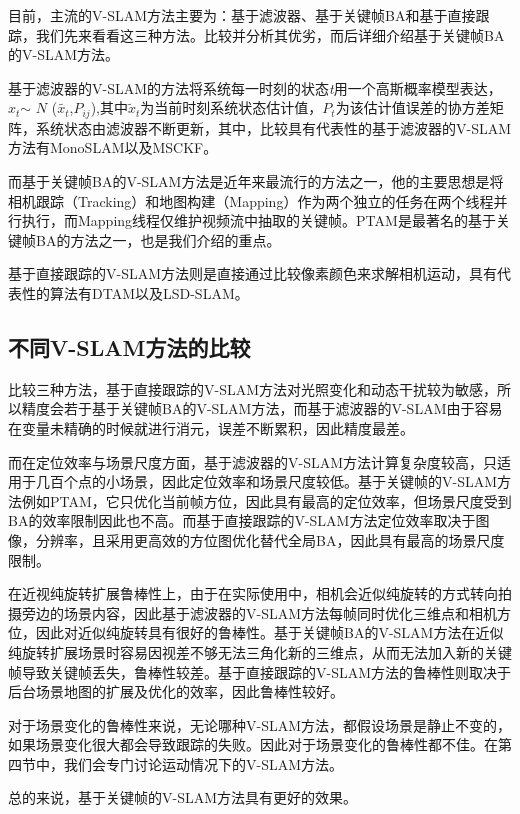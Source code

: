 目前，主流的V-SLAM方法主要为：基于滤波器、基于关键帧BA和基于直接跟踪，我们先来看看这三种方法。比较并分析其优劣，而后详细介绍基于关键帧BA的V-SLAM方法。

基于滤波器的V-SLAM的方法将系统每一时刻的状态\textit{t}用一个高斯概率模型表达，$x_t$$\sim$ $\mathrm{\textit{N}}$ ($\tilde{x_{t}}$,$\mathrm{\textit{P}}_{ij}$),其中$\tilde{x}_t$为当前时刻系统状态估计值，$P_t$为该估计值误差的协方差矩阵，系统状态由滤波器不断更新，其中，比较具有代表性的基于滤波器的V-SLAM方法有MonoSLAM以及MSCKF。

而基于关键帧BA的V-SLAM方法\cite{TriggsB.HartleyR.I.FitzgibbonA.W.2000}是近年来最流行的方法之一，他的主要思想是将相机跟踪（Tracking）和地图构建（Mapping）作为两个独立的任务在两个线程并行执行，而Mapping线程仅维护视频流中抽取的关键帧。PTAM是最著名的基于关键帧BA的方法之一，也是我们介绍的重点。

基于直接跟踪的V-SLAM方法则是直接通过比较像素颜色来求解相机运动，具有代表性的算法有DTAM以及LSD-SLAM。
\subsection{不同V-SLAM方法的比较}
比较三种方法\cite{刘浩敏2016基于单目视觉的同时定位与地图构建方法综述}，基于直接跟踪的V-SLAM方法对光照变化和动态干扰较为敏感，所以精度会若于基于关键帧BA的V-SLAM方法，而基于滤波器的V-SLAM由于容易在变量未精确的时候就进行消元，误差不断累积，因此精度最差。

而在定位效率与场景尺度方面，基于滤波器的V-SLAM方法计算复杂度较高，只适用于几百个点的小场景，因此定位效率和场景尺度较低。基于关键帧的V-SLAM方法例如PTAM，它只优化当前帧方位，因此具有最高的定位效率，但场景尺度受到BA的效率限制因此也不高。而基于直接跟踪的V-SLAM方法定位效率取决于图像，分辨率，且采用更高效的方位图优化替代全局BA，因此具有最高的场景尺度限制。

在近视纯旋转扩展鲁棒性上，由于在实际使用中，相机会近似纯旋转的方式转向拍摄旁边的场景内容，因此基于滤波器的V-SLAM方法每帧同时优化三维点和相机方位，因此对近似纯旋转具有很好的鲁棒性。基于关键帧BA的V-SLAM方法在近似纯旋转扩展场景时容易因视差不够无法三角化新的三维点，从而无法加入新的关键帧导致关键帧丢失，鲁棒性较差。基于直接跟踪的V-SLAM方法的鲁棒性则取决于后台场景地图的扩展及优化的效率，因此鲁棒性较好。

对于场景变化的鲁棒性来说，无论哪种V-SLAM方法，都假设场景是静止不变的，如果场景变化很大都会导致跟踪的失败。因此对于场景变化的鲁棒性都不佳。在第四节中，我们会专门讨论运动情况下的V-SLAM方法。

总的来说，基于关键帧的V-SLAM方法具有更好的效果。

